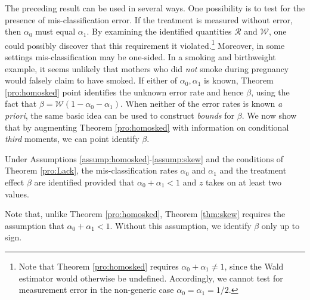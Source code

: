 The preceding result can be used in several ways.
One possibility is to test for the presence of mis-classification error.
If the treatment is measured without error, then $\alpha_0$ must equal $\alpha_1$.
By examining the identified quantities $\mathcal{R}$ and $\mathcal{W}$, one could possibly discover that this requirement it violated.\footnote{Note that Theorem \ref{pro:homosked} requires $\alpha_0 + \alpha_1 \neq 1$, since the Wald estimator would otherwise be undefined. Accordingly, we cannot test for measurement error in the non-generic case $\alpha_0 = \alpha_1 = 1/2$.}
Moreover, in some settings mis-classification may be one-sided.
In a smoking and birthweight example, it seems unlikely that mothers who did \emph{not} smoke during pregnancy would falsely claim to have smoked.
If either of $\alpha_0, \alpha_1$ is known, Theorem \ref{pro:homosked} point identifies the unknown error rate and hence $\beta$, using the fact that $\beta=\mathcal{W}(1-\alpha_0-\alpha_1)$.
When neither of the error rates is known \emph{a priori}, the same basic idea can be used to construct \emph{bounds} for $\beta$.
We now show that by augmenting Theorem \ref{pro:homosked} with information on conditional \emph{third} moments, we can point identify $\beta$.

\begin{thm}
  \label{thm:skew}
  Under Assumptions \ref{assump:homosked}-\ref{assump:skew} and the conditions of Theorem \ref{pro:Lack}, the mis-classification rates $\alpha_0$ and $\alpha_1$ and the treatment effect $\beta$ are identified provided that $\alpha_0 + \alpha_1 < 1$ and $z$ takes on at least two values.
\end{thm}


Note that, unlike Theorem \ref{pro:homosked}, Theorem \ref{thm:skew} requires the assumption that $\alpha_0 + \alpha_1 < 1$.
Without this assumption, we identify $\beta$ only up to sign.
